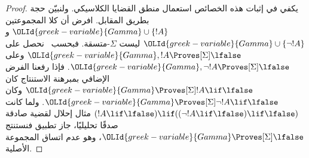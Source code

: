 \documentclass[../../../include/open-logic-section]{subfiles}
\begin{document}
\begin{proof}
  يكفي في إثبات هذه الخصائص استعمال منطق القضايا الكلاسيكي.
  ولنبيّن حجة  بطريق المقابل.
  افرض أن كلا المجموعتين ${\OLId{greek-variable}{Gamma}} \cup \{!A\}$ و${\OLId{greek-variable}{Gamma}} \cup \{\lnot!A\}$
  ليست $ \Sigma$-متسقة. فبحسب~ نحصل على
  ${\OLId{greek-variable}{Gamma}}, !A \Proves[\Sigma] \lfalse$ وعلى
  ${\OLId{greek-variable}{Gamma}}, \lnot !A \Proves[\Sigma] \lfalse$. فإذا رفعنا الفرض الإضافي
  بمبرهنة الاستنتاج كان
  ${\OLId{greek-variable}{Gamma}} \Proves[\Sigma] !A \lif \lfalse$ وكان
  ${\OLId{greek-variable}{Gamma}} \Proves[\Sigma] \lnot!A \lif \lfalse$. ولما كانت
  $(!A \lif \lfalse) \lif ((\lnot!A \lif \lfalse) \lif \lfalse)$
  مثال إحلال لقضية صادقة صدقًا تحليليًا، جاز تطبيق
  فنستنتج ${\OLId{greek-variable}{Gamma}} \Proves[\Sigma] \lfalse$، وهو عدم اتساق المجموعة الأصلية.
\end{proof}
\end{document}
